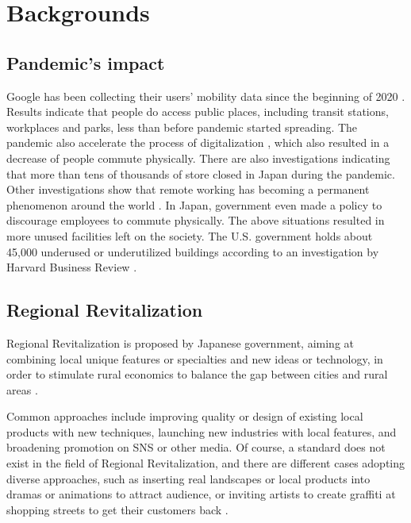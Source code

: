 \chapter{Backgrounds} \label{ch:2}

\section{Pandemic's impact}

Google has been collecting their users' mobility data since the beginning of 2020 \cite{googlemobilityreports} \cite{ourworldindata_2020}.
Results indicate that people do access public places, including transit stations, workplaces and parks, less than before pandemic started spreading.
The pandemic also accelerate the process of digitalization \cite{amankwah-amoah_khan_wood_knight_2021}, which also resulted in a decrease of people commute physically.
There are also investigations indicating that more than tens of thousands of store closed in Japan during the pandemic.
Other investigations show that remote working has becoming a permanent phenomenon around the world \cite{saad_wigert_2021}.
In Japan, government even made a policy to discourage employees to commute physically.
The above situations resulted in more unused facilities left on the society.
The U.S. government holds about 45,000 underused or underutilized buildings according to an investigation by Harvard Business Review \cite{hounsell_2020}.

\section{Regional Revitalization}
Regional Revitalization is proposed by Japanese government, aiming at combining local unique features or specialties and new ideas or technology,
in order to stimulate rural economics to balance the gap between cities and rural areas \cite{sawaji_2019}.

Common approaches include improving quality or design of existing local products with new techniques, launching new industries with local features, and broadening promotion on SNS or other media.
Of course, a standard does not exist in the field of Regional Revitalization, and there are different cases adopting diverse approaches,
such as inserting real landscapes or local products into dramas or animations to attract audience,
or inviting artists to create graffiti at shopping streets to get their customers back \cite{中野経済新聞_2015}\cite{サンテレビニュース_2021}\cite{urbact_2019}.

